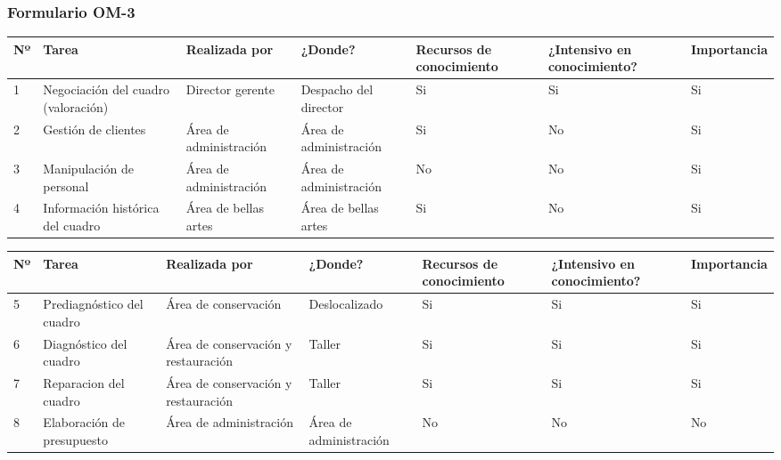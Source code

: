 \documentclass[a4paper,11pt]{article}
\begin{document}
			\newpage
			\begin{landscape}
			\subsubsection{Formulario OM-3}
			\begin{center}
				\begin{tabular}{| l | p{4cm} | p{2.8cm} | p{2cm} | p{2cm} | p{3cm} |
				p{2.2cm} |}
					\hline
					\textbf{Nº} & \textbf{Tarea} & \textbf{Realizada por} & \textbf{¿Donde?} & \textbf{Recursos de conocimiento} &
					\textbf{¿Intensivo en conocimiento?} & \textbf{Importancia}\\
					\hline
					1 & Negociación del cuadro (valoración) & Director gerente & Despacho del
					director & Si & Si & Si\\
					\hline
					2 & Gestión de clientes & Área de administración & Área de administración
					& Si & No & Si\\
					\hline
					3 & Manipulación de personal & Área de administración & Área de
					administración & No & No & Si\\
					\hline
					4 & Información histórica del cuadro & Área de bellas artes & Área de
					bellas artes & Si & No & Si\\
					\hline
				\end{tabular}
			\end{center}
			\end{landscape}
			\newpage
			\begin{landscape}
			\begin{center}
				\begin{tabular}{| l | p{4cm} | p{2.8cm} | p{2cm} | p{2cm} | p{3cm} |
				p{2.2cm} |}
					\hline
					\textbf{Nº} & \textbf{Tarea} & \textbf{Realizada por} & \textbf{¿Donde?} & \textbf{Recursos de conocimiento} &
					\textbf{¿Intensivo en conocimiento?} & \textbf{Importancia}\\
					\hline
					5 & Prediagnóstico del cuadro & Área de conservación & Deslocalizado & Si
					& Si & Si\\
					\hline
					6 & Diagnóstico del cuadro & Área de conservación y restauración & Taller &
					Si & Si & Si\\
					\hline
					7 & Reparacion del cuadro & Área de conservación y restauración & Taller &
					Si & Si & Si\\
					\hline
					8 & Elaboración de presupuesto & Área de administración & Área de
					administración & No & No & No\\
					\hline
				\end{tabular}
			\end{center}
			\end{landscape}
\end{document}
